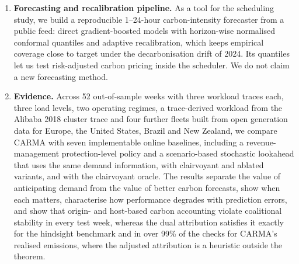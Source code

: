 \begin{enumerate}
\item \textbf{Forecasting and recalibration pipeline.} As a tool for the scheduling study, we build a reproducible 1--24-hour carbon-intensity forecaster from a public feed: direct gradient-boosted models with horizon-wise normalised conformal quantiles and adaptive recalibration, which keeps empirical coverage close to target under the decarbonisation drift of 2024. Its quantiles let us test risk-adjusted carbon pricing inside the scheduler. We do not claim a new forecasting method.
\item \textbf{Evidence.} Across 52 out-of-sample weeks with three workload traces each, three load levels, two operating regimes, a trace-derived workload from the Alibaba 2018 cluster trace and four further fleets built from open generation data for Europe, the United States, Brazil and New Zealand, we compare CARMA with seven implementable online baselines, including a revenue-management protection-level policy and a scenario-based stochastic lookahead that uses the same demand information, with clairvoyant and ablated variants, and with the clairvoyant oracle. The results separate the value of anticipating demand from the value of better carbon forecasts, show when each matters, characterise how performance degrades with prediction errors, and show that origin- and host-based carbon accounting violate coalitional stability in every test week, whereas the dual attribution satisfies it exactly for the hindsight benchmark and in over 99\% of the checks for CARMA's realised emissions, where the adjusted attribution is a heuristic outside the theorem.
\end{enumerate}

